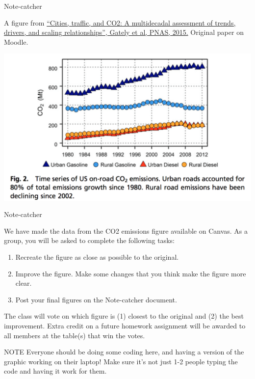 \documentclass[table]{beamer}\usepackage[]{graphicx}\usepackage[]{xcolor}
\begin{document}
\begin{frame}[fragile]{Note-catcher}


A figure from \href{http://www.pnas.org/content/112/16/4999.full.pdf}{``Cities, traffic, and CO2: A multidecadal assessment of trends, drivers, and scaling relationships'', Gately et al, PNAS, 2015.} Original paper on Moodle.

\includegraphics[width=\textwidth]{figure-static/pollution.png}

\end{frame}




\begin{frame}[fragile]{Note-catcher}

We have made the data from the CO2 emissions figure available on Canvas. As a group, you will be asked to complete the following tasks:

\begin{enumerate}
    \item Recreate the figure as close as possible to the original.
    \item Improve the figure. Make some changes that you think make the figure more clear.
    \item Post your final figures on the Note-catcher document.
\end{enumerate}

The class will vote on which figure is (1) closest to the original and (2) the best improvement. Extra credit on a future homework assignment will be awarded to all members at the table(s) that win the votes.

\begin{block}{NOTE}
Everyone should be doing some coding here, and having a version of the graphic working on their laptop! Make sure it's not just 1-2 people typing the code and having it work for them.
\end{block}

\end{frame}
\end{document}
